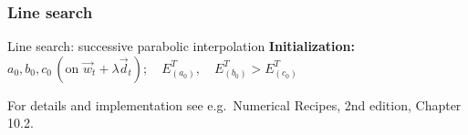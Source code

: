 \begin{frame}\frametitle{Line search}
	\begin{block}{Line search: successive parabolic interpolation}
		\textbf{Initialization:} $a_0, b_0, c_0 \, (\text{on } 
			\vec w_t + \lambda \vec{d}_t);\quad E_{(a_0)}^T,
				\quad E_{(b_0)}^T > E_{(c_0)}^T$
		\vspace{3mm} 

	\end{block}

	{\scriptsize For details and implementation see 
	e.g.~Numerical Recipes, 2nd edition, Chapter 10.2.}
\end{frame}
